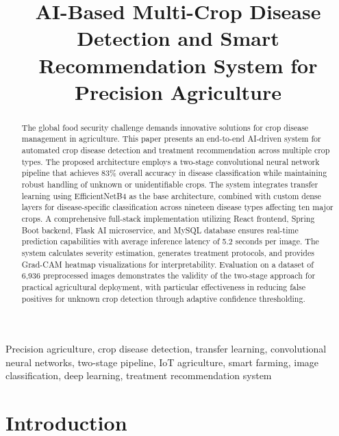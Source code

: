 \documentclass[conference]{IEEEtran}
\begin{document}
\title{AI-Based Multi-Crop Disease Detection and Smart Recommendation System for Precision Agriculture}

\author{
}

\maketitle

\begin{abstract}
The global food security challenge demands innovative solutions for crop disease management in agriculture. This paper presents an end-to-end AI-driven system for automated crop disease detection and treatment recommendation across multiple crop types. The proposed architecture employs a two-stage convolutional neural network pipeline that achieves 83\% overall accuracy in disease classification while maintaining robust handling of unknown or unidentifiable crops. The system integrates transfer learning using EfficientNetB4 as the base architecture, combined with custom dense layers for disease-specific classification across nineteen disease types affecting ten major crops. A comprehensive full-stack implementation utilizing React frontend, Spring Boot backend, Flask AI microservice, and MySQL database ensures real-time prediction capabilities with average inference latency of 5.2 seconds per image. The system calculates severity estimation, generates treatment protocols, and provides Grad-CAM heatmap visualizations for interpretability. Evaluation on a dataset of 6,936 preprocessed images demonstrates the validity of the two-stage approach for practical agricultural deployment, with particular effectiveness in reducing false positives for unknown crop detection through adaptive confidence thresholding.
\end{abstract}

\begin{IEEEkeywords}
Precision agriculture, crop disease detection, transfer learning, convolutional neural networks, two-stage pipeline, IoT agriculture, smart farming, image classification, deep learning, treatment recommendation system
\end{IEEEkeywords}

\section{Introduction}
\label{sec:intro}
\end{document}

